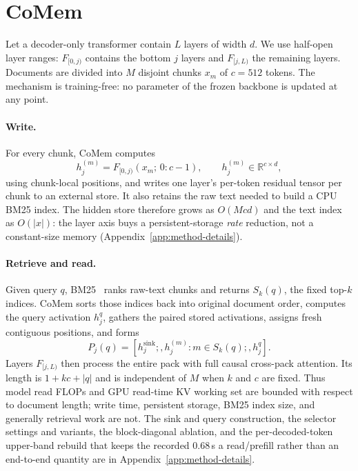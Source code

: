 \section{CoMem}
\label{sec:method}

Let a decoder-only transformer contain $L$ layers of width $d$.  We use
half-open layer ranges: $F_{[0,j)}$ contains the bottom $j$ layers and
$F_{[j,L)}$ the remaining layers.  Documents are divided into $M$ disjoint
chunks $x_m$ of $c=512$ tokens.  The mechanism is training-free: no parameter of
the frozen backbone is updated at any point.

\paragraph{Write.}
For every chunk, CoMem computes
\begin{equation}
    h_j^{(m)}=F_{[0,j)}(x_m;\,0{:}c-1),
    \qquad h_j^{(m)}\in\mathbb{R}^{c\times d},
\end{equation}
using chunk-local positions, and writes one layer's per-token residual tensor
per chunk to an external store.  It also retains the raw text needed to build a
CPU BM25 index.  The hidden store therefore grows as $O(Mcd)$ and the text index
as $O(|x|)$: the layer axis buys a persistent-storage \emph{rate} reduction, not
a constant-size memory (Appendix~\ref{app:method-details}).

\paragraph{Retrieve and read.}
Given query $q$, BM25~\citep{bm25} ranks raw-text chunks and returns $S_k(q)$,
the fixed top-$k$ indices.  CoMem sorts those indices back into original
document order, computes the query activation $h_j^q$, gathers the paired
stored activations, assigns fresh contiguous positions, and forms
\begin{equation}
 P_j(q)=[h_j^{\mathrm{sink}};,{h_j^{(m)}:m\in S_k(q)};,h_j^q].
\end{equation}
Layers $F_{[j,L)}$ then process the entire pack with full causal cross-pack
attention.  Its length is $1+kc+|q|$ and is independent of $M$ when $k$ and
$c$ are fixed.  Thus model read FLOPs and GPU read-time KV working set are
bounded with respect to document length; write time, persistent storage, BM25
index size, and generally retrieval work are not.  The sink and query
construction, the selector settings and variants, the block-diagonal ablation,
and the per-decoded-token upper-band rebuild that keeps the recorded $0.68$\,s a
read/prefill rather than an end-to-end quantity are in
Appendix~\ref{app:method-details}.


